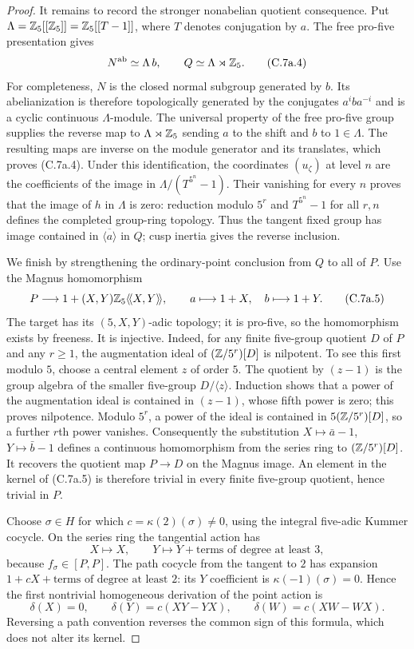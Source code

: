 \begin{proof}
It remains to record the stronger nonabelian quotient consequence.
Put $\Lambda=\mathbb Z_5[[\mathbb Z_5]]=\mathbb Z_5[[T-1]]$, where $T$ denotes conjugation
by $a$. The free pro-five presentation gives
\[
 N^{\rm ab}\simeq\Lambda\,b,\qquad Q\simeq\Lambda\rtimes\mathbb Z_5.
                                                               \tag{C.7a.4}
\]
For completeness, $N$ is the closed normal subgroup generated by $b$.
Its abelianization is therefore topologically generated by the conjugates
$a^i b a^{-i}$ and is a cyclic continuous $\Lambda$-module. The universal
property of the free pro-five group supplies the reverse map to
$\Lambda\rtimes\mathbb Z_5$ sending $a$ to the shift and $b$ to $1\in\Lambda$.
The resulting maps are inverse on the module generator and its translates,
which proves (C.7a.4). Under this identification, the coordinates
$(u_\zeta)$ at level $n$ are the coefficients of the image in
$\Lambda/(T^{5^n}-1)$. Their vanishing for every $n$ proves that the image
of $h$ in $\Lambda$ is zero: reduction modulo $5^r$ and $T^{5^n}-1$
for all $r,n$ defines the completed group-ring topology. Thus the tangent
fixed group has image contained in $\overline{\langle a\rangle}$ in $Q$;
cusp inertia gives the reverse inclusion.

We finish by strengthening the ordinary-point conclusion from $Q$ to
all of $P$. Use the Magnus homomorphism
\[
 P\longrightarrow 1+(X,Y)\mathbb Z_5\langle\!\langle X,Y\rangle\!\rangle,
 \qquad a\longmapsto1+X,\quad b\longmapsto1+Y.                  \tag{C.7a.5}
\]
The target has its $(5,X,Y)$-adic topology; it is pro-five, so the
homomorphism exists by freeness. It is injective. Indeed, for any finite
five-group quotient $D$ of $P$ and any $r\ge1$, the augmentation ideal
of $(\mathbb Z/5^r)[D]$ is nilpotent. To see this first modulo $5$, choose a
central element $z$ of order $5$. The quotient by $(z-1)$ is the group
algebra of the smaller five-group $D/\langle z\rangle$. Induction shows
that a power of the augmentation ideal is contained in $(z-1)$, whose
fifth power is zero; this proves nilpotence. Modulo $5^r$, a power of the
ideal is contained in $5(\mathbb Z/5^r)[D]$, so a further $r$th power vanishes.
Consequently the substitution $X\mapsto\bar a-1$, $Y\mapsto\bar b-1$
defines a continuous homomorphism from the series ring to $(\mathbb Z/5^r)[D]$.
It recovers the quotient map $P\to D$ on the Magnus image. An element
in the kernel of (C.7a.5) is therefore trivial in every finite five-group
quotient, hence trivial in $P$.

Choose $\sigma\in H$ for which $c=\kappa(2)(\sigma)\ne0$, using the
integral five-adic Kummer cocycle. On the series ring the tangential
action has
\[
 X\longmapsto X,\qquad Y\longmapsto Y+\text{terms of degree at least }3,
\]
because $f_\sigma\in[P,P]$. The path cocycle from the tangent to $2$
has expansion $1+cX+\text{terms of degree at least }2$: its $Y$
coefficient is $\kappa(-1)(\sigma)=0$. Hence the first nontrivial
homogeneous derivation of the point action is
\[
 \delta(X)=0,\qquad \delta(Y)=c(XY-YX),\qquad
 \delta(W)=c(XW-WX).                                          \tag{C.7a.6}
\]
Reversing a path convention reverses the common sign of this formula,
which does not alter its kernel.


\end{proof}
